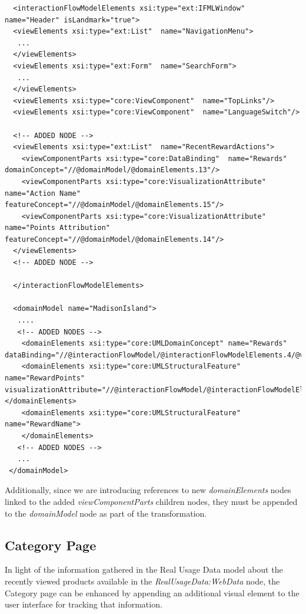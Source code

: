 \vspace{0.5cm}
\lstset{language=XML}
\begin{lstlisting} 
  <interactionFlowModelElements xsi:type="ext:IFMLWindow"  name="Header" isLandmark="true">
  <viewElements xsi:type="ext:List"  name="NavigationMenu">
   ...
  </viewElements>
  <viewElements xsi:type="ext:Form"  name="SearchForm">
   ...
  </viewElements>
  <viewElements xsi:type="core:ViewComponent"  name="TopLinks"/>
  <viewElements xsi:type="core:ViewComponent"  name="LanguageSwitch"/>

  <!-- ADDED NODE -->
  <viewElements xsi:type="ext:List"  name="RecentRewardActions">
    <viewComponentParts xsi:type="core:DataBinding"  name="Rewards" domainConcept="//@domainModel/@domainElements.13"/>
    <viewComponentParts xsi:type="core:VisualizationAttribute"  name="Action Name" featureConcept="//@domainModel/@domainElements.15"/>
    <viewComponentParts xsi:type="core:VisualizationAttribute"  name="Points Attribution" featureConcept="//@domainModel/@domainElements.14"/>
  </viewElements>
  <!-- ADDED NODE -->

  </interactionFlowModelElements>

  <domainModel name="MadisonIsland">
   ....
   <!-- ADDED NODES -->
    <domainElements xsi:type="core:UMLDomainConcept" name="Rewards" dataBinding="//@interactionFlowModel/@interactionFlowModelElements.4/@viewElements.4/@viewComponentParts.0"/>
    <domainElements xsi:type="core:UMLStructuralFeature"  name="RewardPoints" visualizationAttribute="//@interactionFlowModel/@interactionFlowModelElements.4/@viewElements.4/@viewComponentParts.2"></domainElements>
    <domainElements xsi:type="core:UMLStructuralFeature"  name="RewardName">
    </domainElements>
   <!-- ADDED NODES -->
   ...
 </domainModel>
\end{lstlisting}
\vspace{0.5cm}

Additionally, since we are introducing references to new \textit{domainElements} nodes linked to the added \textit{viewComponentParts} children nodes, they must be appended to the \textit{domainModel} node as part of the transformation.

\subsection{Category Page}
\label{category-page-updates}

In light of the information gathered in the Real Usage Data model about the recently viewed products available in the \textit{RealUsageData:WebData} node, the Category page can be enhanced by appending an additional visual element to the user interface for tracking that information.

